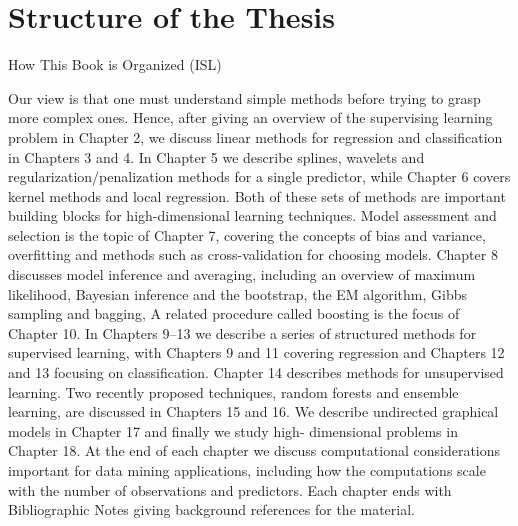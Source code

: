 \section{Structure of the Thesis}

How This Book is Organized (ISL)

Our view is that one must understand simple methods before trying to grasp more complex ones. Hence, after giving an overview of the supervising learning problem in Chapter 2, we discuss linear methods for regression and classification in Chapters 3 and 4. In Chapter 5 we describe splines, wavelets and regularization/penalization methods for a single predictor, while Chapter 6 covers kernel methods and local regression. Both of these sets of methods are important building blocks for high-dimensional learning techniques. Model assessment and selection is the topic of Chapter 7, covering the concepts of bias and variance, overfitting and methods such as cross-validation for choosing models. Chapter 8 discusses model inference and averaging, including an overview of maximum likelihood, Bayesian inference and the bootstrap, the EM algorithm, Gibbs sampling and bagging, A related procedure called boosting is the focus of Chapter 10.
In Chapters 9–13 we describe a series of structured methods for supervised learning, with Chapters 9 and 11 covering regression and Chapters 12 and 13 focusing on classification. Chapter 14 describes methods for unsupervised learning. Two recently proposed techniques, random forests and ensemble learning, are discussed in Chapters 15 and 16. We describe undirected graphical models in Chapter 17 and finally we study high- dimensional problems in Chapter 18.
At the end of each chapter we discuss computational considerations important for data mining applications, including how the computations scale with the number of observations and predictors. Each chapter ends with Bibliographic Notes giving background references for the material.